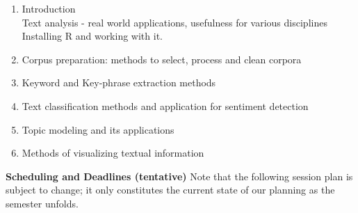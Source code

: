 \documentclass[11pt,a4paper]{article}
\begin{document}
\begin{enumerate}
\item Introduction
\\ Text analysis - real world applications, usefulness for various disciplines 
\\ Installing R and working with it.  %
\item Corpus preparation: methods to select, process and clean corpora  %
\item Keyword and Key-phrase extraction methods %
\item Text classification methods and application for sentiment detection %
\item Topic modeling and its applications  %
\item Methods of visualizing textual information %
\end{enumerate}

\bigskip\textbf{\large Scheduling and Deadlines (tentative)}
Note that the following session plan is subject to change; it only
constitutes the current state of our planning as the semester unfolds.
\end{document}
